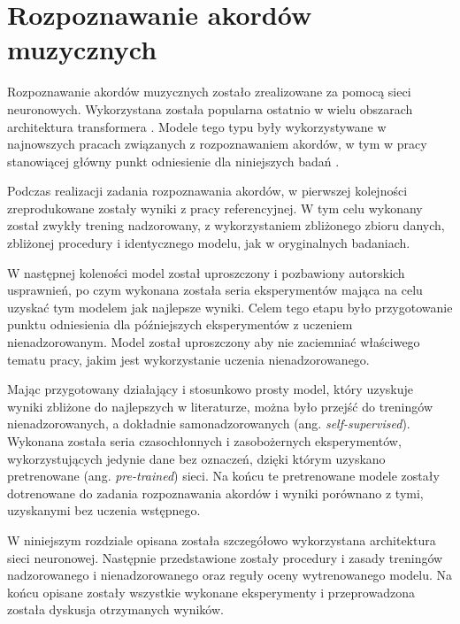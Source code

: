 \chapter{Rozpoznawanie akordów muzycznych}

Rozpoznawanie akordów muzycznych zostało zrealizowane za pomocą sieci neuronowych. Wykorzystana
została popularna ostatnio w wielu obszarach architektura transformera
\cite{vaswani_attention_2017}. Modele tego typu były wykorzystywane w najnowszych pracach związanych
z rozpoznawaniem akordów, w tym w pracy stanowiącej główny punkt odniesienie dla niniejszych badań
\cite{park_bi-directional_2019}.

Podczas realizacji zadania rozpoznawania akordów, w pierwszej kolejności zreprodukowane zostały
wyniki z pracy referencyjnej. W tym celu wykonany został zwykły trening nadzorowany, z
wykorzystaniem zbliżonego zbioru danych, zbliżonej procedury i identycznego modelu, jak w
oryginalnych badaniach.

W następnej koleności model został uproszczony i pozbawiony autorskich usprawnień, po czym wykonana
została seria eksperymentów mająca na celu uzyskać tym modelem jak najlepsze wyniki. Celem tego
etapu było przygotowanie punktu odniesienia dla późniejszych eksperymentów z uczeniem
nienadzorowanym. Model został uproszczony aby nie zaciemniać właściwego tematu pracy, jakim jest
wykorzystanie uczenia nienadzorowanego.

Mając przygotowany działający i stosunkowo prosty model, który uzyskuje wyniki zbliżone do
najlepszych w literaturze, można było przejść do treningów nienadzorowanych, a dokładnie
samonadzorowanych (ang. \emph{self-supervised}). Wykonana została seria czasochłonnych i
zasobożernych eksperymentów, wykorzystujących jedynie dane bez oznaczeń, dzięki którym uzyskano
pretrenowane (ang. \emph{pre-trained}) sieci. Na końcu te pretrenowane modele zostały dotrenowane do
zadania rozpoznawania akordów i wyniki porównano z tymi, uzyskanymi bez uczenia wstępnego.

W niniejszym rozdziale opisana została szczegółowo wykorzystana architektura sieci neuronowej.
Następnie przedstawione zostały procedury i zasady treningów nadzorowanego i nienadzorowanego oraz
reguły oceny wytrenowanego modelu. Na końcu opisane zostały wszystkie wykonane eksperymenty i
przeprowadzona została dyskusja otrzymanych wyników.

